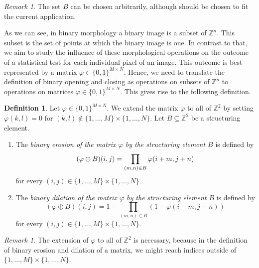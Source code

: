 \documentclass[a4paper,12pt]{article}
\theoremstyle{plain}
\theoremstyle{definition}
\newtheorem{definition}[theorem]{Definition}
\theoremstyle{remark}
\newtheorem{remark}[theorem]{Remark}
\begin{document}
\begin{remark}
	The set $B$ can be chosen arbitrarily, although should be chosen to fit the current application.
\end{remark}

As we can see, in binary morphology a binary image is a subset of $\mathbb{Z}^n$. This subset is the set of points at which the binary image is one. In contrast to that, we aim to study the influence of these morphological operations on the outcome of a statistical test for each individual pixel of an image. This outcome is best represented by a matrix $\varphi \in \{ 0, 1 \}^{M \times N}$. Hence, we need to translate the definition of binary opening and closing as operations on subsets of $\mathbb{Z}^n$ to operations on matrices $\varphi \in \{ 0, 1 \}^{M \times N}$. This gives rise to the following definition.

\begin{definition}
	Let $\varphi \in \{ 0, 1 \}^{M \times N}$. We extend the matrix $\varphi$ to all of $\mathbb{Z}^2$ by setting $\varphi(k, l) = 0$ for $(k, l) \notin \{ 1, \dots, M \} \times \{ 1, \dots, N \}$. Let $B \subseteq \mathbb{Z}^2$ be a structuring element.
	\begin{enumerate}
		\item The \emph{binary erosion of the matrix $\varphi$ by the structuring element $B$} is defined by
		\begin{equation}
			(\varphi \ominus B)(i, j) = \prod_{(m, n) \in B} \varphi(i + m, j + n) \\
		\end{equation}
		for every $(i, j) \in \{ 1, \dots, M \} \times \{ 1, \dots, N \}$.
		\item The \emph{binary dilation of the matrix $\varphi$ by the structuring element $B$} is defined by
		\begin{equation}
			(\varphi \oplus B)(i, j) = 1 - \prod_{(m, n) \in B} ( 1 - \varphi(i - m, j - n) )
		\end{equation}
		for every $(i, j) \in \{ 1, \dots, M \} \times \{ 1, \dots, N \}$.
	\end{enumerate}
\end{definition}

\begin{remark}
	The extension of $\varphi$ to all of $\mathbb{Z}^2$ is necessary, because in the definition of binary erosion and dilation of a matrix, we might reach indices outside of $\{ 1, \dots, M \} \times \{ 1, \dots, N \}$.
\end{remark}
\end{document}
